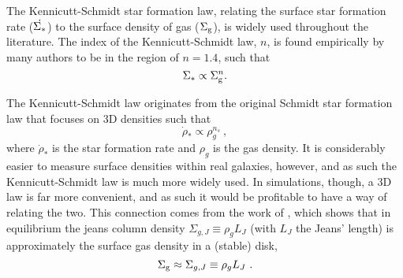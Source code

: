 The Kennicutt-Schmidt star formation law, relating the surface star formation rate ($\dot{\Sigma_*}$) to the surface density of gas ($\Sigma_\mathrm{g}$), is widely used throughout the literature.
The index of the Kennicutt-Schmidt law, $n$, is found empirically by many authors \citep{kennicutt_star_1989, kennicutt_jr._star_2007, bigiel_star_2008} to be in the region of $n=1.4$, such that
\begin{equation}
\label{eqn:ks}
\Sigma_* \propto \Sigma_\mathrm{g}^n.
\end{equation}

The Kennicutt-Schmidt law originates from the original Schmidt star formation law  \cite{schmidt_rate_1959} that focuses on 3D densities such that
\begin{equation}
\label{eqn:s}
\dot{\rho}_* \propto \rho_g^{n_s}~,
\end{equation}
where $\dot{\rho}_*$ is the star formation rate and $\rho_g$ is the gas density.
It is considerably easier to measure surface densities within real galaxies, however, and as such the Kennicutt-Schmidt law is much more widely used.
In simulations, though, a 3D law is far more convenient, and as such it would be profitable to have a way of relating the two. 
This connection comes from the work of \citet{schaye_model-independent_2001}, which shows that in equilibrium the jeans column density $\Sigma_{g, J} \equiv \rho_g L_J$ (with $L_J$ the Jeans' length) is approximately the surface gas density in a (stable) disk,
\begin{equation}
\label{eqn:s04}
\Sigma_\mathrm{g} \approx \Sigma_{g, J} \equiv \rho_g L_J~.
\end{equation}
